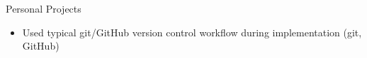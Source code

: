 \documentclass{resume} %
\begin{document}
\begin{workSection}{Personal Projects}
\begin{itemize}
        \item Used typical git/GitHub version control workflow during implementation (git, GitHub)
    \end{itemize}
\end{workSection}
\end{document}
